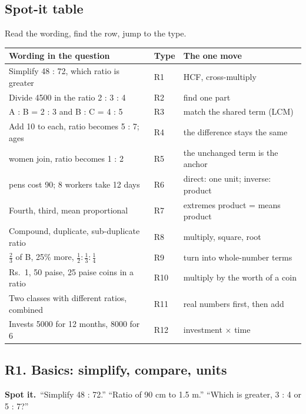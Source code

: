 \documentclass[11pt,a4paper]{article}
\let\oldsubsection\subsection
\renewcommand{\subsection}{\needspace{9\baselineskip}\oldsubsection}
\newcommand{\spot}{\textbf{\color{ember}Spot it.}\ }
\begin{document}
\subsection*{Spot-it table}
Read the wording, find the row, jump to the type.
\begin{center}\small\renewcommand{\arraystretch}{1.18}\setlength{\tabcolsep}{7pt}
\begin{tabularx}{\linewidth}{@{}>{\raggedright\arraybackslash}X l >{\raggedright\arraybackslash}X@{}}
\toprule
\textbf{\color{slate}Wording in the question} & \textbf{\color{slate}Type} & \textbf{\color{slate}The one move} \\ \midrule
Simplify 48 : 72, which ratio is greater & R1 & HCF, cross-multiply \\
Divide 4500 in the ratio 2 : 3 : 4 & R2 & find one part \\
A : B = 2 : 3 and B : C = 4 : 5 & R3 & match the shared term (LCM) \\
Add 10 to each, ratio becomes 5 : 7; ages & R4 & the difference stays the same \\
24 women join, ratio becomes 1 : 2 & R5 & the unchanged term is the anchor \\
6 pens cost 90; 8 workers take 12 days & R6 & direct: one unit; inverse: product \\
Fourth, third, mean proportional & R7 & extremes product = means product \\
Compound, duplicate, sub-duplicate ratio & R8 & multiply, square, root \\
$\tfrac23$ of B, 25\% more, $\tfrac12 : \tfrac13 : \tfrac14$ & R9 & turn into whole-number terms \\
Rs.\ 1, 50 paise, 25 paise coins in a ratio & R10 & multiply by the worth of a coin \\
Two classes with different ratios, combined & R11 & real numbers first, then add \\
Invests 5000 for 12 months, 8000 for 6 & R12 & investment $\times$ time \\
\bottomrule
\end{tabularx}\end{center}

\subsection{R1. Basics: simplify, compare, units}
\spot ``Simplify 48 : 72.'' ``Ratio of 90 cm to 1.5 m.'' ``Which is greater, 3 : 4 or 5 : 7?''
\end{document}

